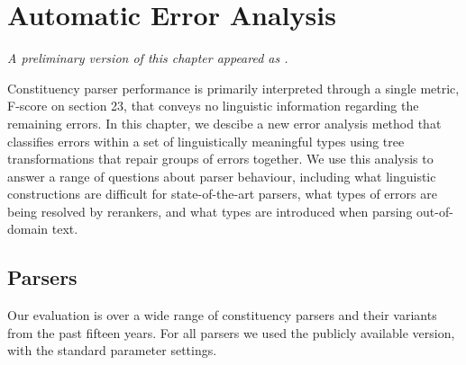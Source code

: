 \chapter{Automatic Error Analysis}

\begin{center}
\textit{
  A preliminary version of this chapter appeared as \textcite{Kummerfeld:2012:EMNLP}.
}
\end{center}

Constituency parser performance is primarily interpreted through a single metric, F-score on \wsj section 23, that conveys no linguistic information regarding the remaining errors.
In this chapter, we descibe a new error analysis method that classifies errors within a set of linguistically meaningful types using tree transformations that repair groups of errors together.
We use this analysis to answer a range of questions about parser behaviour, including what linguistic constructions are difficult for state-of-the-art parsers, what types of errors are being resolved by rerankers, and what types are introduced when parsing out-of-domain text.


\section{Parsers}

Our evaluation is over a wide range of \ptb constituency parsers and their variants from the past fifteen years.
For all parsers we used the publicly available version, with the standard parameter settings.

